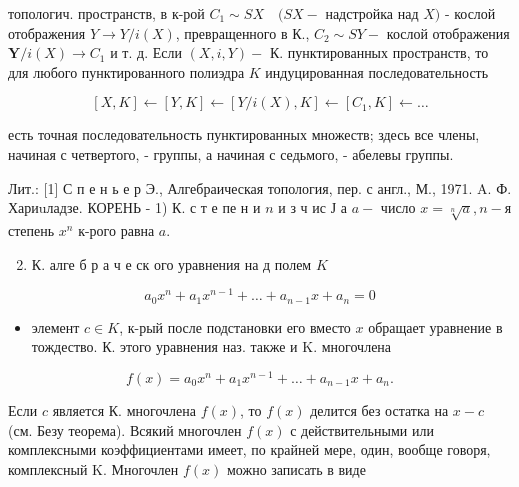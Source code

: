 \documentclass[10pt]{article}
\begin{document}
топологич. пространств, в к-рой $C_{1} \sim S X \quad(S X-$ надстройка над $X)$ - кослой отображения $Y \rightarrow Y / i(X)$, превращенного в К., $C_{2} \sim S Y-$ кослой отображения $\boldsymbol{Y} / i(X) \rightarrow C_{1}$ и т. д. Если $(X, i, Y)-$ К. пунктированных пространств, то для любого пунктированного полиэдра $K$ индуцированная последовательность



\[

[X, K] \leftarrow[Y, K] \leftarrow[Y / i(X), K] \leftarrow\left[C_{1}, K\right] \leftarrow \ldots

\]



есть точная последовательность пунктированных множеств; здесь все члены, начиная с четвертого, - группы, а начиная с седьмого, - абелевы группы.



Лит.: [1] С п е н ь е р Э., Алгебраическая топология, пер. с англ., М., 1971. A. Ф. Хариuладзе. КОРЕНЬ - 1) К. с т е пе н и $n$ и з ч ис Ј а $a-$ число $x=\sqrt[n]{a}, n-я$ степень $x^{n}$ к-рого равна $a$.



\begin{enumerate}

  \setcounter{enumi}{1}

  \item К. алге б р а ч е ск ого уравнения на д полем $K$

\end{enumerate}



\[

a_{0} x^{n}+a_{1} x^{n-1}+\ldots+a_{n-1} x+a_{n}=0

\]



\begin{itemize}

  \item элемент $c \in K$, к-рый после подстановки его вместо $x$ обращает уравнение в тождество. К. этого уравнения наз. также и $\mathrm{K}$. многочлена

\end{itemize}



\[

f(x)=a_{0} x^{n}+a_{1} x^{n-1}+\ldots+a_{n-1} x+a_{n} .

\]



Если $c$ является К. многочлена $f(x)$, то $f(x)$ делится без остатка на $x-c$ (см. Безу теорема). Всякий многочлен $f(x)$ с действительными или комплексными коэффициентами имеет, по крайней мере, один, вообще говоря, комплексный $\mathrm{K}$. Многочлен $f(x)$ можно записать в виде
\end{document}
